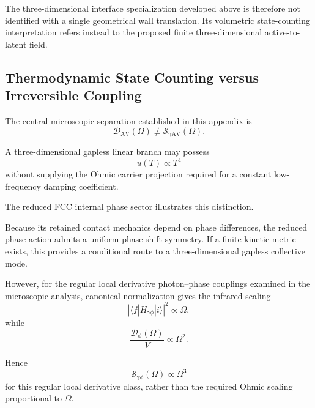 The three-dimensional interface specialization developed above is therefore
not identified with a single geometrical wall translation. Its volumetric
state-counting interpretation refers instead to the proposed finite
three-dimensional active-to-latent field.


\subsection{Thermodynamic State Counting versus Irreversible Coupling}

The central microscopic separation established in this appendix is
\begin{equation}
    \mathcal D_{\mathrm{AV}}(\Omega)
    \not\equiv
    \mathcal S_{\gamma\mathrm{AV}}(\Omega).
    \label{eq:AT_constraint_DOS_projection}
\end{equation}

A three-dimensional gapless linear branch may possess
\begin{equation}
    u(T)\propto T^4
\end{equation}
without supplying the Ohmic carrier projection required for a constant
low-frequency damping coefficient.

The reduced FCC internal phase sector illustrates this distinction.

Because its retained contact mechanics depend on phase differences, the
reduced phase action admits a uniform phase-shift symmetry. If a finite
kinetic metric exists, this provides a conditional route to a
three-dimensional gapless collective mode.

However, for the regular local derivative photon--phase couplings examined
in the microscopic analysis, canonical normalization gives the infrared
scaling
\begin{equation}
    \left|
        \langle f|
        H_{\gamma\phi}
        |i\rangle
    \right|^2
    \propto
    \Omega,
\end{equation}
while
\begin{equation}
    \frac{
        \mathcal D_\phi(\Omega)
    }{
        V
    }
    \propto
    \Omega^2.
\end{equation}

Hence
\begin{equation}
    \mathcal S_{\gamma\phi}(\Omega)
    \propto
    \Omega^3
\end{equation}
for this regular local derivative class, rather than the required Ohmic
scaling proportional to
\(\Omega\).

